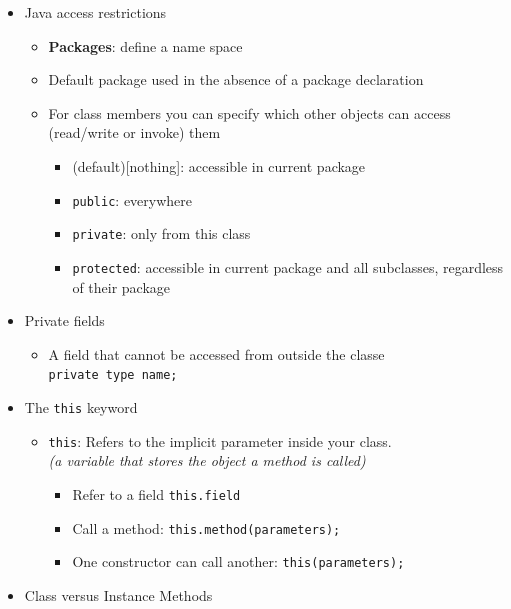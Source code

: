 \documentclass[a4paper]{article}
\newcommand{\inline}[1]{\lstinline!#1!}%
\begin{document}
\begin{itemize}
\begin{itemize}
\begin{itemize}
\begin{itemize}
							\end{itemize}
				\end{itemize}
		\end{itemize}
	\item Java access restrictions
		\begin{itemize}
			\item \textbf{Packages}: define a name space
			\item Default package used in the absence of a package declaration
			\item For class members you can specify which other objects can access (read/write or invoke) them
				\begin{itemize}
					\item (default)[nothing]: accessible in current package
					\item \inline{public}: everywhere
					\item \inline{private}: only from this class
					\item \inline{protected}: accessible in current package and all subclasses, regardless of their package
				\end{itemize}
		\end{itemize}
	 \item Private fields
	 	\begin{itemize}
	 		\item A field that cannot be accessed from outside the classe\\
	 		\inline{private type name;}
	 	\end{itemize}
	 \item The \inline{this} keyword
	 	\begin{itemize}
	 		\item \inline{this}: Refers to the implicit parameter inside your class.\\\textit{(a variable that stores the object a method is called)}
	 			\begin{itemize}
	 				\item Refer to a field \inline{this.field}
	 				\item Call a method: \inline{this.method(parameters);}
	 				\item One constructor can call another: \inline{this(parameters);}
	 			\end{itemize}
	 	\end{itemize}
	 \item Class versus Instance Methods
	 	\begin{itemize}

\end{itemize}
\end{itemize}
\end{document}
